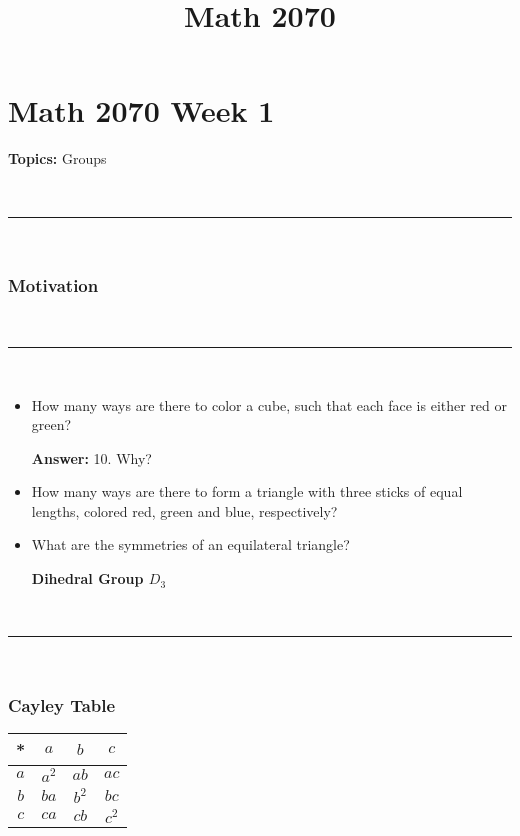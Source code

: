 \documentclass[a4paper,12pt]{report}
\newcounter{statement}
\numberwithin{statement}{chapter}
\numberwithin{equation}{chapter}
\numberwithin{section}{chapter}
\numberwithin{subsection}{section}
\begin{document}
\title{Math 2070}
\setcounter{chapter}{1}\setcounter{section}{0}
\setcounter{subsection}{0}
\setcounter{statement}{0}

\chapter*{Math 2070 Week 1}
{\bf Topics: }Groups


\quad\\\hrule
\quad\\
\subsection*{Motivation}


\quad\\\hrule
\quad\\

\begin{itemize}
\item 
How many ways are there to color a cube, such that each face is either red or green?




 {\bf Answer:} 
10. Why?




\item 
How many ways are there to form a triangle with three sticks of equal lengths, colored
red, green and blue, respectively?




\item 
What are the symmetries of an equilateral triangle?




\textbf{Dihedral Group $D_3$}










\end{itemize}




\quad\\\hrule
\quad\\
\subsection*{Cayley Table}



\begin{center}
\begin{tabular}{|c|c|c|c|}
\hline
*&$a$&$b$&$c$ \\
\hline
$a$&$a^2$&$ab$&$ac$ \\
\hline
$b$&$ba$&$b^2$&$bc$ \\
\hline
$c$&$ca$&$cb$&$c^2$\\\hline
\end{tabular}
\end{center}
\end{document}
